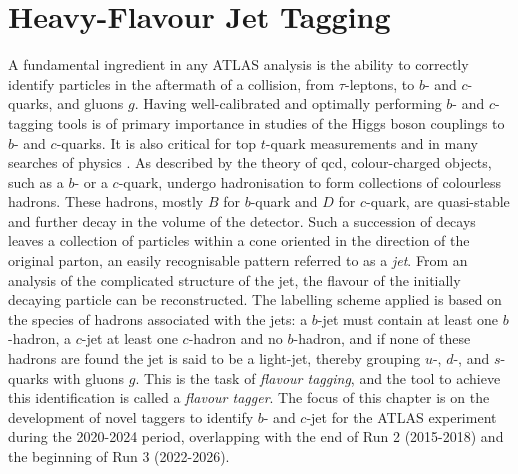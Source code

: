 \section{Heavy-Flavour Jet Tagging}
A fundamental ingredient in any ATLAS analysis is the ability to correctly identify particles in the aftermath of a collision, from $\tau$-leptons, to $b$- and $c$-quarks, and gluons $g$. Having well-calibrated and optimally performing $b$- and $c$-tagging tools is of primary importance in studies of the Higgs boson couplings to $b$- and $c$-quarks. It is also critical for top $t$-quark measurements and in many searches of physics . As described by the theory of \gls{qcd}, colour-charged objects, such as a $b$- or a $c$-quark, undergo hadronisation to form collections of colourless hadrons. These hadrons, mostly $B$ for $b$-quark and $D$ for $c$-quark, are quasi-stable and further decay in the volume of the detector. Such a succession of decays leaves a collection of particles within a cone oriented in the direction of the original parton, an easily recognisable pattern referred to as a \textit{jet}. From an analysis of the complicated structure of the jet, the flavour of the initially decaying particle can be reconstructed. The labelling scheme applied is based on the species of hadrons associated with the jets: a $b$-jet must contain at least one $b$-hadron, a $c$-jet at least one $c$-hadron and no $b$-hadron, and if none of these hadrons are found the jet is said to be a light-jet, thereby grouping $u$-, $d$-, and $s$-quarks with gluons $g$. This is the task of \textit{flavour tagging}, and the tool to achieve this identification is called a \textit{flavour tagger}. The focus of this chapter is on the development of novel taggers to identify $b$- and $c$-jet for the ATLAS experiment during the 2020-2024 period, overlapping with the end of Run 2 (2015-2018) and the beginning of Run 3 (2022-2026). \\

